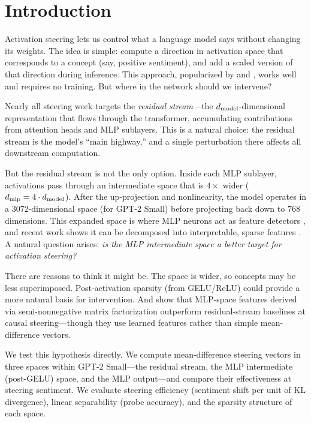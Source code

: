 \section{Introduction}
\label{sec:intro}

Activation steering lets us control what a language model says without changing its weights. The idea is simple: compute a direction in activation space that corresponds to a concept (say, positive sentiment), and add a scaled version of that direction during inference. This approach, popularized by \citet{turner2023activation} and \citet{zou2023representation}, works well and requires no training. But where in the network should we intervene?

Nearly all steering work targets the \emph{residual stream}---the $d_{\text{model}}$-dimensional representation that flows through the transformer, accumulating contributions from attention heads and MLP sublayers. This is a natural choice: the residual stream is the model's ``main highway,'' and a single perturbation there affects all downstream computation.

But the residual stream is not the only option. Inside each MLP sublayer, activations pass through an intermediate space that is $4\times$ wider ($d_{\text{mlp}} = 4 \cdot d_{\text{model}}$). After the up-projection and nonlinearity, the model operates in a 3072-dimensional space (for GPT-2 Small) before projecting back down to 768 dimensions. This expanded space is where MLP neurons act as feature detectors \citep{cunningham2023sparse}, and recent work shows it can be decomposed into interpretable, sparse features \citep{dunefsky2024transcoders, shafran2025decomposing}. A natural question arises: \emph{is the MLP intermediate space a better target for activation steering?}

There are reasons to think it might be. The space is wider, so concepts may be less superimposed. Post-activation sparsity (from GELU/ReLU) could provide a more natural basis for intervention. And \citet{shafran2025decomposing} show that MLP-space features derived via semi-nonnegative matrix factorization outperform residual-stream baselines at causal steering---though they use learned features rather than simple mean-difference vectors.

We test this hypothesis directly. We compute mean-difference steering vectors \citep{turner2023activation} in three spaces within GPT-2 Small---the residual stream, the MLP intermediate (post-GELU) space, and the MLP output---and compare their effectiveness at steering sentiment. We evaluate steering efficiency (sentiment shift per unit of KL divergence), linear separability (probe accuracy), and the sparsity structure of each space.

